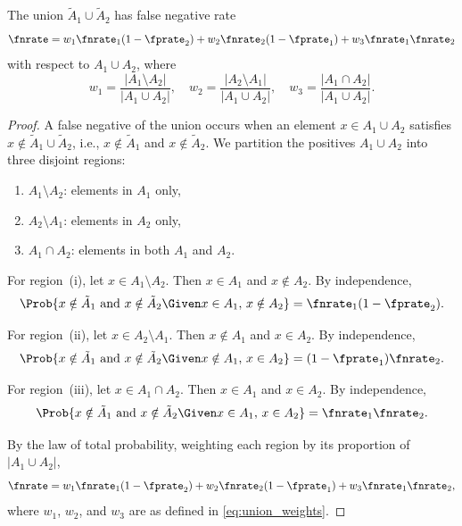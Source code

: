\begin{theorem}
\label{thm:union_fnrate}
The union $\tilde{A}_1 \cup \tilde{A}_2$ has false negative rate
\begin{equation}
\label{eq:union_fnr}
\fnrate = w_1 \fnrate_1 (1 - \fprate_2)
        + w_2 \fnrate_2 (1 - \fprate_1)
        + w_3 \fnrate_1 \fnrate_2
\end{equation}
with respect to $A_1 \cup A_2$, where
\begin{equation}
\label{eq:union_weights}
w_1 = \frac{|A_1 \setminus A_2|}{|A_1 \cup A_2|}, \quad
w_2 = \frac{|A_2 \setminus A_1|}{|A_1 \cup A_2|}, \quad
w_3 = \frac{|A_1 \cap A_2|}{|A_1 \cup A_2|}.
\end{equation}
\end{theorem}
\begin{proof}
A false negative of the union occurs when an element $x \in A_1 \cup A_2$
satisfies $x \notin \tilde{A}_1 \cup \tilde{A}_2$, i.e.,
$x \notin \tilde{A}_1$ and $x \notin \tilde{A}_2$.
We partition the positives $A_1 \cup A_2$ into three disjoint regions:
\begin{enumerate}[label=(\roman*)]
    \item $A_1 \setminus A_2$: elements in $A_1$ only,
    \item $A_2 \setminus A_1$: elements in $A_2$ only,
    \item $A_1 \cap A_2$: elements in both $A_1$ and $A_2$.
\end{enumerate}

For region~(i), let $x \in A_1 \setminus A_2$.
Then $x \in A_1$ and $x \notin A_2$.
By independence,
\begin{equation}
\Prob{x \notin \tilde{A}_1 \text{ and } x \notin \tilde{A}_2
    \Given x \in A_1,\, x \notin A_2}
= \fnrate_1 (1 - \fprate_2).
\end{equation}

For region~(ii), let $x \in A_2 \setminus A_1$.
Then $x \notin A_1$ and $x \in A_2$.
By independence,
\begin{equation}
\Prob{x \notin \tilde{A}_1 \text{ and } x \notin \tilde{A}_2
    \Given x \notin A_1,\, x \in A_2}
= (1 - \fprate_1) \fnrate_2.
\end{equation}

For region~(iii), let $x \in A_1 \cap A_2$.
Then $x \in A_1$ and $x \in A_2$.
By independence,
\begin{equation}
\Prob{x \notin \tilde{A}_1 \text{ and } x \notin \tilde{A}_2
    \Given x \in A_1,\, x \in A_2}
= \fnrate_1 \fnrate_2.
\end{equation}

By the law of total probability, weighting each region by its proportion
of $|A_1 \cup A_2|$,
\begin{equation}
\fnrate
= w_1 \fnrate_1 (1 - \fprate_2)
+ w_2 \fnrate_2 (1 - \fprate_1)
+ w_3 \fnrate_1 \fnrate_2,
\end{equation}
where $w_1$, $w_2$, and $w_3$ are as defined in
\cref{eq:union_weights}.
\end{proof}

